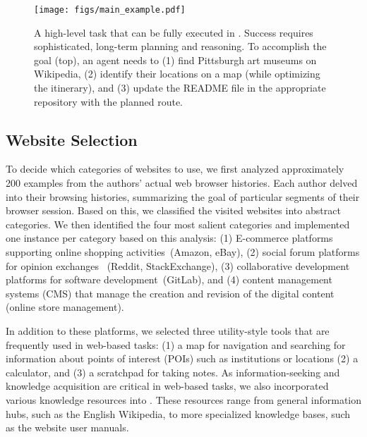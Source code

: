 \begin{figure}
    \vspace{-10mm}
    \centering
    \texttt{[image: figs/main\_example.pdf]}
    \caption{A high-level task that can be fully executed in \ours{}. Success requires sophisticated, long-term planning and reasoning. To accomplish the goal (top), an agent needs to (1) find Pittsburgh art museums on Wikipedia, (2) identify their locations on a map (while optimizing the itinerary), %
    and (3) update the README file in the appropriate repository with the planned route.}
    \label{fig:main_example}
    \vspace{-10pt}
\end{figure}

\subsection{Website Selection}\label{sec:website_selection}
To decide which categories of websites to use, we first analyzed approximately 200 examples from the authors' actual web browser histories. Each author delved into their browsing histories, summarizing the goal of particular segments of their browser session. Based on this, we classified the visited websites into abstract categories.
We then identified the four most salient categories and implemented one instance per category based on this analysis: (1) E-commerce platforms supporting online shopping activities~(\eg Amazon, eBay), (2) social forum platforms for opinion exchanges~ (\eg Reddit, StackExchange), (3) collaborative development platforms for software development~(\eg GitLab), and (4) content management systems (CMS) that manage the creation and revision of the digital content (\eg online store management).

In addition to these platforms, we selected three utility-style tools that are frequently used in web-based tasks: (1) a map for navigation and searching for information about points of interest (POIs) such as institutions or locations (2) a calculator, and (3) a scratchpad for taking notes.
As information-seeking and knowledge acquisition are critical in web-based tasks, we also incorporated various knowledge resources into \ours. These resources range from general information hubs, such as the English Wikipedia, to more specialized knowledge bases, such as the website user manuals. 

